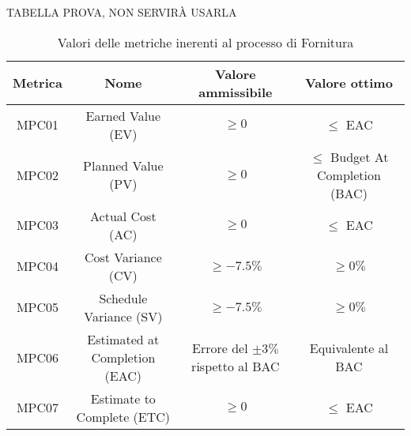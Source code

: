 TABELLA PROVA, NON SERVIRÀ USARLA
\begin{table}[h!]
	\centering
	\begin{tabular}{|c|c|c|c|} 
	 \hline
	 Metrica & Nome & Valore ammissibile & Valore ottimo \\  
	 \hline
	 MPC01 & Earned Value (EV) & $\geq 0$ & $\leq$ EAC \\
	 \hline
	 MPC02 & Planned Value (PV) & $\geq 0$ & $\leq$ Budget At Completion (BAC) \\ 
	 \hline
	 MPC03 & Actual Cost (AC) & $\geq 0$ & $\leq$ EAC \\ 
	 \hline
	 MPC04 & Cost Variance (CV) & $\geq -7.5\%$ & $\geq 0\%$ \\ 
	 \hline
	 MPC05 & Schedule Variance (SV) & $\geq -7.5\%$ & $\geq 0\%$ \\ 
	 \hline
	 MPC06 & Estimated at Completion (EAC) & Errore del $\pm 3\%$ rispetto al BAC  & Equivalente al BAC \\ 
	 \hline
	 MPC07 & Estimate to Complete (ETC)  & $\geq 0$ & $\leq$ EAC \\ 
	 \hline
	\end{tabular}
	\caption{Valori delle metriche inerenti al processo di Fornitura}
	\label{table:1}
\end{table}